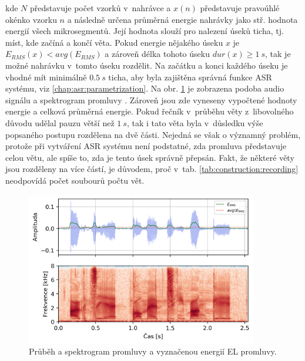 \noindent kde $N$ představuje počet vzorků v~nahrávce a $x(n)$ představuje pravoúhlé okénko vzorku $n$ a následně určena průměrná energie nahrávky jako stř. hodnota energií všech mikrosegmentů.
Její hodnota slouží pro nalezení úseků ticha, tj. míst, kde začíná a končí věta.
Pokud energie nějakého úseku $x$ je $E_{RMS}(x) < avg(E_{RMS})$ a zároveň délka tohoto úseku $dur(x) \geq 1\ s$, tak je možné nahrávku v~tomto úseku rozdělit. Na začátku a konci každého úseku je vhodné mít minimálně $0.5\ s$ ticha, aby byla zajištěna správná funkce ASR systému, viz \ref{chap:asr:parametrization}.
Na obr. \ref{fig:construction:el_speech} je zobrazena podoba audio signálu a spektrogram promluvy \textit{}.
Zároveň jsou zde vyneseny vypočtené hodnoty energie a celková průměrná energie.
Pokud řečník v~průběhu věty z~libovolného důvodu udělal pauzu větší než $1\ s$, tak i tato věta byla v~důsledku výše popsaného postupu rozdělena na dvě části.
Nejedná se však o významný problém, protože při vytváření ASR systému není podstatné, zda promluva představuje celou větu, ale spíše to, zda je tento úsek správně přepsán.
Fakt, že některé věty jsou rozděleny na více částí, je důvodem, proč v~tab. \ref{tab:construction:recording} neodpovídá počet soubourů počtu vět.

\begin{figure}[hbpt]
  \centering
  \includegraphics[width=0.9\textwidth]{./ch5-construction/img/energy_spec_el.png}
  \caption{Průběh a spektrogram promluvy a vyznačenou energií EL promluvy.}
  \label{fig:construction:el_speech}
\end{figure}

